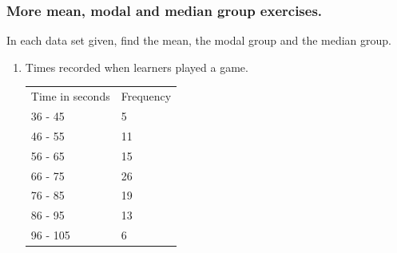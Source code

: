 \begin{description}[noitemsep]
\begin{description}[noitemsep]
            \subsubsection{  More mean, modal and median group exercises. }
            \nopagebreak
        \label{m39400*id215497}In each data set given, find the mean, the modal group and the median group.\par 
        \label{m39400*id215504}\begin{enumerate}[noitemsep, label=\textbf{\arabic*}. ] 
            \label{m39400*uid103}\item Times recorded when learners played a game.
          \begin{table}[H]
        \begin{center}
      \label{m39400*id215519}
    \noindent
      \tablelasttail{}
      \begin{xtabular}[t]{|l|l|}\hline
        Time in seconds &
        Frequency%
     \tabularnewline{}
        36 - 45 &
        5%
     \tabularnewline{}
        46 - 55 &
        11%
     \tabularnewline{}
        56 - 65 &
        15%
     \tabularnewline{}
        66 - 75 &
        26%
     \tabularnewline{}
        76 - 85 &
        19%
     \tabularnewline{}
        86 - 95 &
        13%
     \tabularnewline{}
        96 - 105 &
        6%

\end{xtabular}
\end{center}
\end{table}
\end{enumerate}
\end{description}
\end{description}
